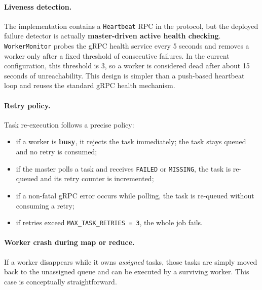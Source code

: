 \documentclass{scrartcl}
\begin{document}
\paragraph{Liveness detection.}
The implementation contains a \texttt{Heartbeat} RPC in the protocol, but the deployed failure detector is actually \textbf{master-driven active health checking}. \texttt{WorkerMonitor} probes the gRPC health service every 5 seconds and removes a worker only after a fixed threshold of consecutive failures. In the current configuration, this threshold is 3, so a worker is considered dead after about 15 seconds of unreachability. This design is simpler than a push-based heartbeat loop and reuses the standard gRPC health mechanism.

\paragraph{Retry policy.}
Task re-execution follows a precise policy:
%
\begin{itemize}
    \item if a worker is \textbf{busy}, it rejects the task immediately; the task stays queued and no retry is consumed;
    \item if the master polls a task and receives \texttt{FAILED} or \texttt{MISSING}, the task is re-queued and its retry counter is incremented;
    \item if a non-fatal gRPC error occurs while polling, the task is re-queued without consuming a retry;
    \item if retries exceed \texttt{MAX\_TASK\_RETRIES = 3}, the whole job fails.
\end{itemize}

\paragraph{Worker crash during map or reduce.}
If a worker disappears while it owns \emph{assigned} tasks, those tasks are simply moved back to the unassigned queue and can be executed by a surviving worker. This case is conceptually straightforward.
\end{document}

